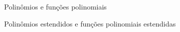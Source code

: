 \documentclass[oneside,12pt]{article}
\begin{document}
\newpage

Polinômios e funções polinomiais

\newpage

Polinômios estendidos e funções polinomiais estendidas



\newpage


\newpage




{}  %
\end{document}
